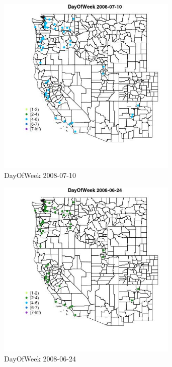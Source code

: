 \begin{figure} 
\centering  
\includegraphics[width=0.77\textwidth]{Code_Outputs/Report_ML_input_PM25_Step4_part_e_de_duplicated_aves_MapObsDayOfWeek2008-07-10.jpg} 
\caption{\label{fig:Report_ML_input_PM25_Step4_part_e_de_duplicated_avesMapObsDayOfWeek2008-07-10}DayOfWeek 2008-07-10} 
\end{figure} 
 

\clearpage 

\begin{figure} 
\centering  
\includegraphics[width=0.77\textwidth]{Code_Outputs/Report_ML_input_PM25_Step4_part_e_de_duplicated_aves_MapObsDayOfWeek2008-06-24.jpg} 
\caption{\label{fig:Report_ML_input_PM25_Step4_part_e_de_duplicated_avesMapObsDayOfWeek2008-06-24}DayOfWeek 2008-06-24} 
\end{figure} 
 

